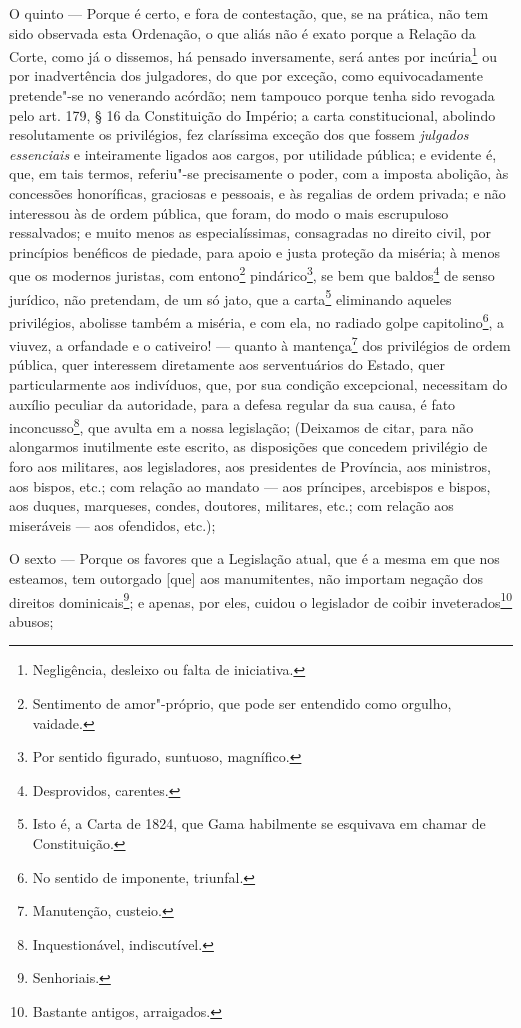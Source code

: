 O quinto --- Porque é certo, e fora de contestação, que, se na prática,
não tem sido observada esta Ordenação, o que aliás não é exato porque a
Relação da Corte, como já o dissemos, há pensado inversamente, será
antes por incúria\footnote{Negligência, desleixo ou falta de
  iniciativa.} ou por inadvertência dos julgadores, do que por exceção,
como equivocadamente pretende"-se no venerando acórdão; nem tampouco
porque tenha sido revogada pelo art. 179, § 16 da Constituição do
Império; a carta constitucional, abolindo resolutamente os privilégios,
fez claríssima exceção dos que fossem \emph{julgados essenciais} e
inteiramente ligados aos cargos, por utilidade pública; e evidente é,
que, em tais termos, referiu"-se precisamente o poder, com a imposta
abolição, às concessões honoríficas, graciosas e pessoais, e às regalias
de ordem privada; e não interessou às de ordem pública, que foram, do
modo o mais escrupuloso ressalvados; e muito menos as especialíssimas,
consagradas no direito civil, por princípios benéficos de piedade, para
apoio e justa proteção da miséria; à menos que os modernos juristas, com
entono\footnote{Sentimento de amor"-próprio, que pode ser entendido
  como orgulho, vaidade.} pindárico\footnote{Por sentido figurado,
  suntuoso, magnífico.}, se bem que baldos\footnote{Desprovidos,
  carentes.} de senso jurídico, não pretendam, de um só jato, que a
carta\footnote{Isto é, a Carta de 1824, que Gama habilmente se
  esquivava em chamar de Constituição.} eliminando aqueles privilégios,
abolisse também a miséria, e com ela, no radiado golpe
capitolino\footnote{No sentido de imponente, triunfal.}, a viuvez, a
orfandade e o cativeiro! --- quanto à mantença\footnote{Manutenção,
  custeio.} dos privilégios de ordem pública, quer interessem
diretamente aos serventuários do Estado, quer particularmente aos
indivíduos, que, por sua condição excepcional, necessitam do auxílio
peculiar da autoridade, para a defesa regular da sua causa, é fato
inconcusso\footnote{Inquestionável, indiscutível.}, que avulta em a
nossa legislação; (Deixamos de citar, para não alongarmos inutilmente
este escrito, as disposições que concedem privilégio de foro aos
militares, aos legisladores, aos presidentes de Província, aos
ministros, aos bispos, etc.; com relação ao mandato --- aos príncipes,
arcebispos e bispos, aos duques, marqueses, condes, doutores, militares,
etc.; com relação aos miseráveis --- aos ofendidos, etc.);

O sexto --- Porque os favores que a Legislação atual, que é a mesma em
que nos esteamos, tem outorgado {[}que{]} aos manumitentes, não importam
negação dos direitos dominicais\footnote{Senhoriais.}; e apenas, por
eles, cuidou o legislador de coibir inveterados\footnote{Bastante
  antigos, arraigados.} abusos;

